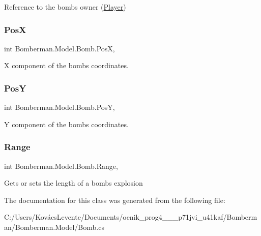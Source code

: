 Reference to the bomb\textquotesingle{}s owner (\mbox{\hyperlink{class_bomberman_1_1_model_1_1_player}{Player}}) 

\mbox{\label{class_bomberman_1_1_model_1_1_bomb_a66f8cc2285c09bca8c19df5f8a3d1f0b}} 
\subsubsection{\texorpdfstring{PosX}{PosX}}
{\footnotesize\ttfamily int Bomberman.\+Model.\+Bomb.\+PosX\hspace{0.3cm}{\ttfamily [get]}, {\ttfamily [set]}}



X component of the bomb\textquotesingle{}s coordinates. 

\mbox{\label{class_bomberman_1_1_model_1_1_bomb_a8dc94176d28e54462950607da08a03a4}} 
\subsubsection{\texorpdfstring{PosY}{PosY}}
{\footnotesize\ttfamily int Bomberman.\+Model.\+Bomb.\+PosY\hspace{0.3cm}{\ttfamily [get]}, {\ttfamily [set]}}



Y component of the bomb\textquotesingle{}s coordinates. 

\mbox{\label{class_bomberman_1_1_model_1_1_bomb_afc808bfdf103aa6910375d19c00589c9}} 
\subsubsection{\texorpdfstring{Range}{Range}}
{\footnotesize\ttfamily int Bomberman.\+Model.\+Bomb.\+Range\hspace{0.3cm}{\ttfamily [get]}, {\ttfamily [set]}}



Gets or sets the length of a bomb\textquotesingle{}s explosion 



The documentation for this class was generated from the following file\+:\begin{DoxyCompactItemize}
\item 
C\+:/\+Users/\+Kovács\+Levente/\+Documents/oenik\+\_\+prog4\+\_\+\_\+\_\+p71jvi\+\_\+u41kaf/\+Bomberman/\+Bomberman.\+Model/Bomb.\+cs\end{DoxyCompactItemize}
